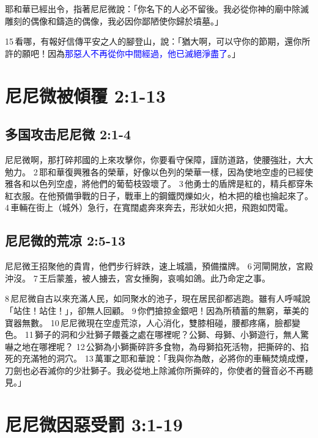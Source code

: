 耶和華已經出令，指著尼尼微說：「你名下的人必不留後。我必從你神的廟中除滅雕刻的偶像和鑄造的偶像，我必因你鄙陋使你歸於墳墓。」

15 看哪，有報好信傳平安之人的腳登山，說：「猶大啊，可以守你的節期，還你所許的願吧！因為\textcolor{blue}{那惡人不再從你中間經過，他已滅絕淨盡了}。」




\section{尼尼微被傾覆 2:1-13}

\subsection{多国攻击尼尼微 2:1-4}
尼尼微啊，那打碎邦國的上來攻擊你，你要看守保障，謹防道路，使腰強壯，大大勉力。 2 耶和華復興雅各的榮華，好像以色列的榮華一樣，因為使地空虛的已經使雅各和以色列空虛，將他們的葡萄枝毀壞了。 3 他勇士的盾牌是紅的，精兵都穿朱紅衣服。在他預備爭戰的日子，戰車上的鋼鐵閃爍如火，柏木把的槍也掄起來了。 4 車輛在街上（城外）急行，在寬闊處奔來奔去，形狀如火把，飛跑如閃電。

\subsection{尼尼微的荒凉 2:5-13}

尼尼微王招聚他的貴胄，他們步行絆跌，速上城牆，預備擋牌。 6 河閘開放，宮殿沖沒。 7 王后蒙羞，被人擄去，宮女捶胸，哀鳴如鴿。此乃命定之事。

8 尼尼微自古以來充滿人民，如同聚水的池子，現在居民卻都逃跑。雖有人呼喊說「站住！站住！」，卻無人回顧。 9 你們搶掠金銀吧！因為所積蓄的無窮，華美的寶器無數。 10 尼尼微現在空虛荒涼，人心消化，雙膝相碰，腰都疼痛，臉都變色。 11 獅子的洞和少壯獅子餵養之處在哪裡呢？公獅、母獅、小獅遊行，無人驚嚇之地在哪裡呢？ 12 公獅為小獅撕碎許多食物，為母獅掐死活物，把撕碎的、掐死的充滿牠的洞穴。 13 萬軍之耶和華說：「我與你為敵，必將你的車輛焚燒成煙，刀劍也必吞滅你的少壯獅子。我必從地上除滅你所撕碎的，你使者的聲音必不再聽見。」

\section{尼尼微因惡受罰 3:1-19}
